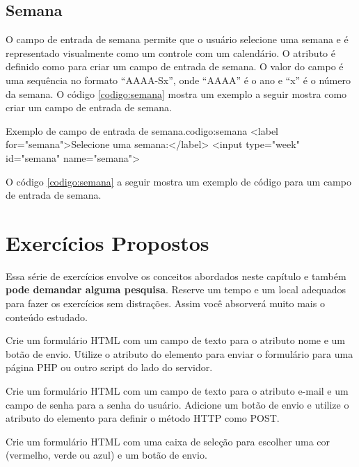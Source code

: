 \subsection{Semana}

O campo de entrada de semana permite que o usuário selecione uma semana e é representado visualmente como um controle com um calendário. O atributo  é definido como  para criar um campo de entrada de semana. O valor do campo é uma sequência no formato ``AAAA-Sx'', onde ``AAAA'' é o ano e ``x'' é o número da semana. O código \ref{codigo:semana} mostra um exemplo a seguir mostra como criar um campo de entrada de semana.

\begin{htmlcode}{Exemplo de campo de entrada de semana.}{codigo:semana}
<label for="semana">Selecione uma semana:</label>
<input type="week" id="semana" name="semana">
\end{htmlcode}

O código \ref{codigo:semana} a seguir mostra um exemplo de código para um campo de entrada de semana.

\section{Exercícios Propostos}

Essa série de exercícios envolve os conceitos abordados neste capítulo e também \textbf{pode demandar alguma pesquisa}. Reserve um tempo e um local adequados para fazer os exercícios sem distrações. Assim você absorverá muito mais o conteúdo estudado.

\begin{exercise}
Crie um formulário HTML com um campo de texto para o atributo nome e um botão de envio. Utilize o atributo  do elemento  para enviar o formulário para uma página PHP ou outro script do lado do servidor.
\end{exercise}

\begin{exercise}
Crie um formulário HTML com um campo de texto para o atributo e-mail e um campo de senha para a senha do usuário. Adicione um botão de envio e utilize o atributo  do elemento  para definir o método HTTP como POST.
\end{exercise}

\begin{exercise}
Crie um formulário HTML com uma caixa de seleção para escolher uma cor (vermelho, verde ou azul) e um botão de envio.
\end{exercise}

